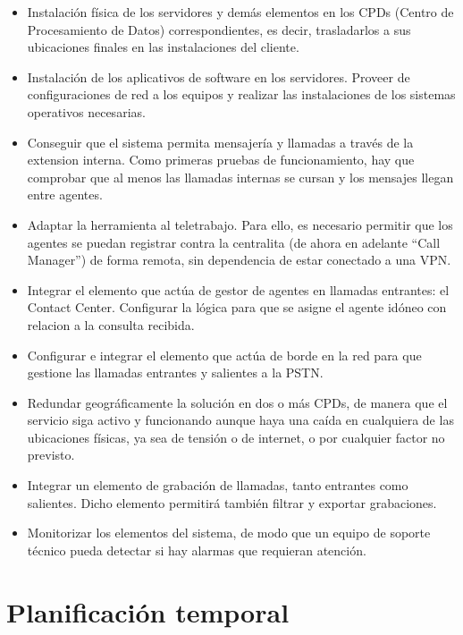 \documentclass[a4paper, 12pt]{book}
\begin{document}
\begin{itemize}
  \item Instalación física de los servidores y demás elementos en los CPDs (Centro de Procesamiento de Datos) correspondientes, es decir, trasladarlos a sus ubicaciones finales en las instalaciones del cliente.
  
  \item Instalación de los aplicativos de software en los servidores. Proveer de configuraciones de red a los equipos y realizar las instalaciones de los sistemas operativos necesarias.

  \item Conseguir que el sistema permita mensajería y llamadas a través de la extension interna. Como primeras pruebas de funcionamiento, hay que comprobar que al menos las llamadas internas se cursan y los mensajes llegan entre agentes.
  
  \item Adaptar la herramienta al teletrabajo. Para ello, es necesario permitir que los agentes se puedan registrar contra la centralita (de ahora en adelante ``Call Manager'') de forma remota, sin dependencia de estar conectado a una VPN.   

  \item Integrar el elemento que actúa de gestor de agentes en llamadas entrantes: el Contact Center. Configurar la lógica para que se asigne el agente idóneo con relacion a la consulta recibida.

  \item Configurar e integrar el elemento que actúa de borde en la red para que gestione las llamadas entrantes y salientes a la PSTN.
  
  \item Redundar geográficamente la solución en dos o más CPDs, de manera que el servicio siga activo y funcionando aunque haya una caída en cualquiera de las ubicaciones físicas, ya sea de tensión o de internet, o por cualquier factor no previsto.

  \item Integrar un elemento de grabación de llamadas, tanto entrantes como salientes. Dicho elemento permitirá también filtrar y exportar grabaciones.
  
  \item Monitorizar los elementos del sistema, de modo que un equipo de soporte técnico pueda detectar si hay alarmas que requieran atención.
\end{itemize}

\section{Planificación temporal}
\label{sec:planificacion-temporal}
\end{document}
